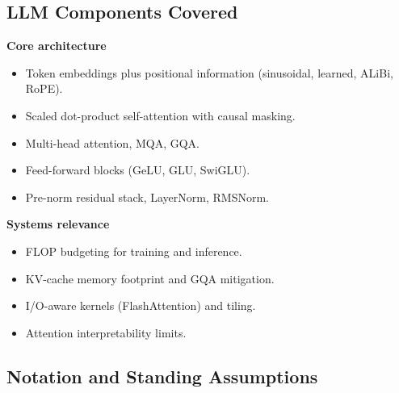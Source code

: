 \subsection{LLM Components Covered}

\textbf{Core architecture}
\begin{itemize}
  \item Token embeddings plus positional information (sinusoidal,
        learned, ALiBi, RoPE).
  \item Scaled dot-product self-attention with causal masking.
  \item Multi-head attention, MQA, GQA.
  \item Feed-forward blocks (GeLU, GLU, SwiGLU).
  \item Pre-norm residual stack, LayerNorm, RMSNorm.
\end{itemize}

\textbf{Systems relevance}
\begin{itemize}
  \item FLOP budgeting for training and inference.
  \item KV-cache memory footprint and GQA mitigation.
  \item I/O-aware kernels (FlashAttention) and tiling.
  \item Attention interpretability limits.
\end{itemize}

\subsection{Notation and Standing Assumptions}
\label{sec:week4-notation}

